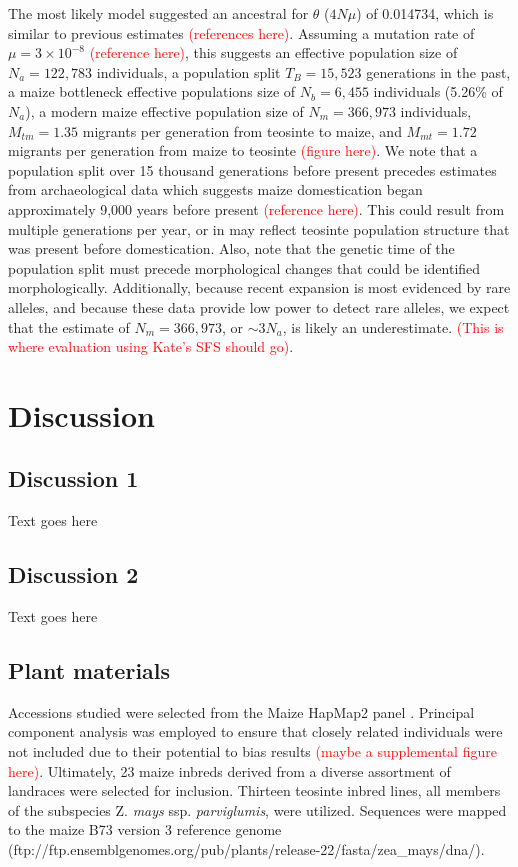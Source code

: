 \documentclass{pnastwo}
\begin{document}
\begin{article}
The most likely model suggested an ancestral for $\theta$ ($4N\mu$) of
0.014734, which is similar to previous estimates
\textcolor{red}{(references here)}. Assuming a mutation rate of $\mu =
3 \times 10^{-8}$ \textcolor{red}{(reference here)}, this suggests an effective
population size of $N_a = 122,783$ individuals, a population split
$T_B = 15,523$ generations in the past, a maize bottleneck
effective populations size of $N_b = 6,455$ individuals (5.26\% of
$N_a$), a modern maize effective population size of $N_m = 366,973$
individuals, $M_{tm} = 1.35$ migrants per generation from teosinte to
maize, and $M_{mt} = 1.72$ migrants per generation from maize to
teosinte \textcolor{red}{(figure here)}. We note that a population
split over 15 thousand generations before present precedes estimates
from
archaeological data which suggests maize domestication began
approximately 9,000 years before present \textcolor{red}{(reference
  here)}. This could result from multiple generations per year, or in
may reflect teosinte population structure that was present before
domestication. Also, note that the genetic time of the population
split must precede morphological changes that could be identified
morphologically.   Additionally, because recent expansion is
most evidenced by rare alleles, and because these data provide low
power to detect rare alleles, we expect that the estimate of  $N_m =
366,973$, or $\sim 3N_a$, is likely an underestimate. \textcolor{red}{(This
  is where evaluation using Kate's SFS should go)}.


\section{Discussion}
\subsection{Discussion 1}
Text goes here

\subsection{Discussion 2}
Text goes here

\begin{materials}
\subsection{Plant materials}
Accessions studied were selected from the Maize HapMap2
panel \cite{chia2012} . Principal component analysis was employed to ensure that
closely related individuals were not included due to their potential
to bias results \textcolor{red}{(maybe a supplemental figure here)}. Ultimately, 23 maize inbreds derived from a diverse
assortment of landraces were selected for inclusion. Thirteen teosinte
inbred lines, all members of the subspecies Z. \emph{mays}
ssp. \emph{parviglumis}, were utilized. Sequences were mapped to the
maize B73 version 3 reference genome \cite{schnable2009}
(ftp://ftp.ensemblgenomes.org/pub/plants/release-22/fasta/zea\_mays/dna/).


\end{materials}
\end{article}
\end{document}
